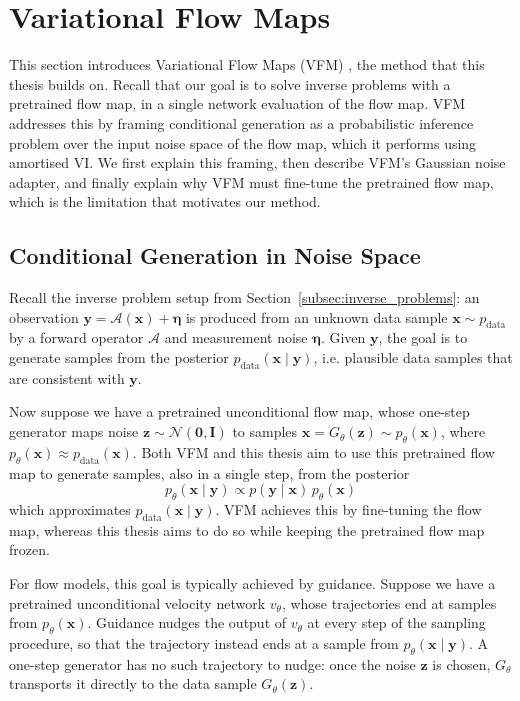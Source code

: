 \documentclass[12pt,a4paper]{report}
\begin{document}
\section{Variational Flow Maps}
\label{sec:variational_flow_maps}
This section introduces Variational Flow Maps (VFM) \parencite{VFM}, the method that this thesis builds on. Recall that our goal is to solve inverse problems with a pretrained flow map, in a single network evaluation of the flow map. VFM addresses this by framing conditional generation as a probabilistic inference problem over the input noise space of the flow map, which it performs using amortised VI. We first explain this framing, then describe VFM's Gaussian noise adapter, and finally explain why VFM must fine-tune the pretrained flow map, which is the limitation that motivates our method.

\subsection{Conditional Generation in Noise Space}
\label{subsec:vfm_noise_space}
Recall the inverse problem setup from Section~\ref{subsec:inverse_problems}: an observation $\mathbf{y}=\mathcal{A}(\mathbf{x})+\boldsymbol{\eta}$ is produced from an unknown data sample $\mathbf{x}\sim p_{\mathrm{data}}$ by a forward operator $\mathcal{A}$ and measurement noise $\boldsymbol{\eta}$. Given $\mathbf{y}$, the goal is to generate samples from the posterior $p_{\mathrm{data}}(\mathbf{x}\mid\mathbf{y})$, i.e. plausible data samples that are consistent with $\mathbf{y}$.

Now suppose we have a pretrained unconditional flow map, whose one-step generator maps noise $\mathbf{z}\sim\mathcal{N}(\mathbf{0},\mathbf{I})$ to samples $\mathbf{x}=G_{\theta}(\mathbf{z})\sim p_{\theta}(\mathbf{x})$, where $p_{\theta}(\mathbf{x})\approx p_{\mathrm{data}}(\mathbf{x})$. Both VFM and this thesis aim to use this pretrained flow map to generate samples, also in a single step, from the posterior
\begin{equation}
p_{\theta}(\mathbf{x}\mid\mathbf{y})
\propto
p(\mathbf{y}\mid\mathbf{x})\,p_{\theta}(\mathbf{x})
\label{eq:model_posterior}
\end{equation}
which approximates $p_{\mathrm{data}}(\mathbf{x}\mid\mathbf{y})$. VFM achieves this by fine-tuning the flow map, whereas this thesis aims to do so while keeping the pretrained flow map frozen.

For flow models, this goal is typically achieved by guidance. Suppose we have a pretrained unconditional velocity network $v_{\theta}$, whose trajectories end at samples from $p_{\theta}(\mathbf{x})$. Guidance nudges the output of $v_{\theta}$ at every step of the sampling procedure, so that the trajectory instead ends at a sample from $p_{\theta}(\mathbf{x}\mid\mathbf{y})$.
A one-step generator has no such trajectory to nudge: once the noise $\mathbf{z}$ is chosen, $G_{\theta}$ transports it directly to the data sample $G_{\theta}(\mathbf{z})$.
\end{document}
